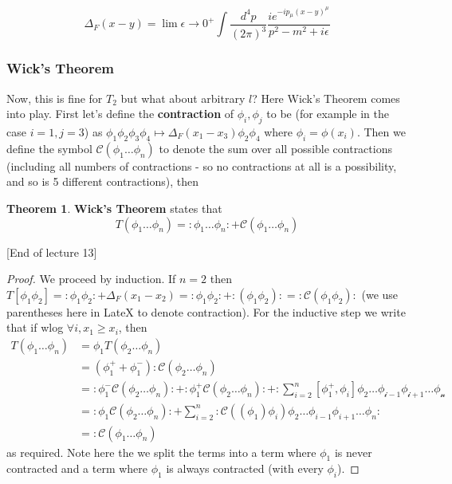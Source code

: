 \documentclass{article}
\theoremstyle{definition}
\newtheorem{theorem}{Theorem}
\begin{document}
$$ \Delta_F(x - y) = \lim{\epsilon \to 0^+} \int \frac{d^4p}{(2\pi)^3} \frac{i
  e^{-ip_\mu (x - y)^\mu}}{p^2 - m^2 + i\epsilon} $$

\subsubsection{Wick's Theorem}

Now, this is fine for $T_2$ but what about arbitrary $l$? Here Wick's Theorem
comes into play. First let's define the \textbf{contraction} of $\phi_i, \phi_j$
to be (for example in the case $i=1, j=3$) as $\phi_1 \phi_2 \phi_3 \phi_4
\mapsto \Delta_F(x_1 - x_3) \phi_2 \phi_4$ where $\phi_i = \phi(x_i)$. Then we
define the symbol $\mathcal{C}(\phi_1 \dots \phi_n)$ to denote the sum over all
possible contractions (including all numbers of contractions - so no
contractions at all is a possibility, and so is 5 different contractions), then

\begin{theorem}
  \textbf{Wick's Theorem} states that
  $$ T(\phi_1 \dots \phi_n) = : \phi_1 \dots \phi_n : + \mathcal{C}(\phi_1 \dots
  \phi_n) $$
\end{theorem}

[End of lecture 13]

\begin{proof}
  We proceed by induction. If $n = 2$ then $T[\phi_1 \phi_2] = : \phi_1 \phi_2 :
  + \Delta_F(x_1 - x_2) = :\phi_1 \phi_2: + :(\phi_1 \phi_2): =
  :\mathcal{C}(\phi_1 \phi_2):$ (we use parentheses here in LateX to denote
  contraction). For the inductive step we write that if wlog $\forall i,  x_1
  \geq x_i$, then
\begin{align*}
T(\phi_1 \dots \phi_n) &= \phi_1 T(\phi_2 \dots \phi_n) \\
&= (\phi^+_1 + \phi^-_1) : \mathcal{C}(\phi_2 \dots \phi_n) \\
&= :\phi_1^- \mathcal{C}(\phi_2 \dots \phi_n): + :\phi_1^+ \mathcal{C}(\phi_2 \dots \phi_n): + : \sum_{i=2}^n [\phi_1^+, \phi_i] \mathcal{\phi_2 \dots \phi_{i - 1} \phi_{i + 1} \dots \phi_n} \\
&= :\phi_1 \mathcal{C}(\phi_2 \dots \phi_n): + \sum_{i = 2}^n :\mathcal{C}((\phi_1) \phi_i) \phi_2 \dots \phi_{i - 1} \phi_{i + 1} \dots \phi_n: \\
&= :\mathcal{C}(\phi_1 \dots \phi_n) 
\end{align*}
as required. Note here the we split the terms into a term where $\phi_1$ is
never contracted and a term where $\phi_1$ is always contracted (with every
$\phi_i$).
\end{proof}
\end{document}
